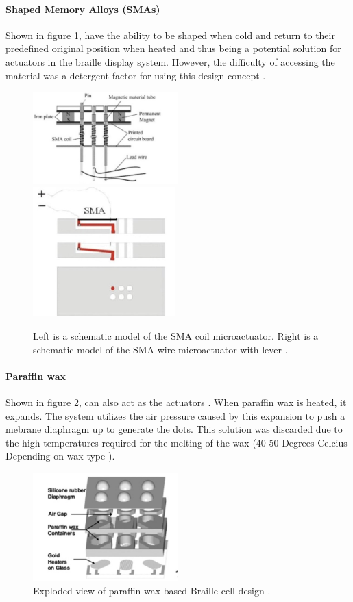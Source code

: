 \paragraph{Shaped Memory Alloys (SMAs)}
Shown in figure \ref{fig:sma}, have the ability to be shaped when cold and return to their predefined original position when heated and thus being a potential solution for actuators in the braille display system. However, the difficulty of accessing the material was a detergent factor for using this design concept  \cite{chaves_microtuators_2009}.

\begin{figure}[h]\centering
    \includegraphics[width=0.5\textwidth]{figures/Coil_SMA_mechanism.png}
    \includegraphics[height=5cm]{figures/sma-mechanism.png}
    \caption[Schematics of Shaped Memory Alloy (SMA) mechanisms]{ Left is a schematic model of the SMA coil microactuator. Right is a schematic model of the SMA wire microactuator with lever \cite{haga_dynamic_2005}.}
    \label{fig:sma}
\end{figure}

\paragraph{Paraffin wax}
Shown in figure \ref{fig:paraffin}, can also act as the actuators \cite{lee_micromachined_2005}. When paraffin wax is heated, it expands.
The system utilizes the air pressure caused by this expansion to push a mebrane diaphragm up to generate the dots. This solution was discarded due to the high temperatures required for the melting of the wax (40-50 Degrees Celcius Depending on wax type \cite{lee_micromachined_2005}).

\begin{figure}[h] \centering
    \includegraphics[width=0.5\textwidth]{figures/paraffin.png}
\caption[Paraffin-based Braille cell]{Exploded view of paraffin wax-based Braille cell design \cite{lee_micromachined_2005}.}
\label{fig:paraffin}
\end{figure}
